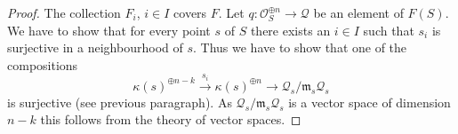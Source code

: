 \documentclass{stacks-project}
\theoremstyle{plain}
\theoremstyle{definition}
\theoremstyle{remark}
\numberwithin{equation}{subsection}
\begin{document}
\begin{proof}
\medskip\noindent
The collection $F_i$, $i \in I$ covers $F$. Let
$q : \mathcal{O}_S^{\oplus n} \to \mathcal{Q}$ be an element of
$F(S)$. We have to show that for every point $s$ of $S$ there exists
an $i \in I$ such that $s_i$ is surjective in a neighbourhood of $s$.
Thus we have to show that one of the compositions
$$
\kappa(s)^{\oplus n - k} \xrightarrow{s_i}
\kappa(s)^{\oplus n} \rightarrow
\mathcal{Q}_s/\mathfrak m_s\mathcal{Q}_s
$$
is surjective (see previous paragraph). As
$\mathcal{Q}_s/\mathfrak m_s\mathcal{Q}_s$ is a vector space of
dimension $n - k$ this follows from the theory of vector spaces.
\end{proof}
\end{document}
